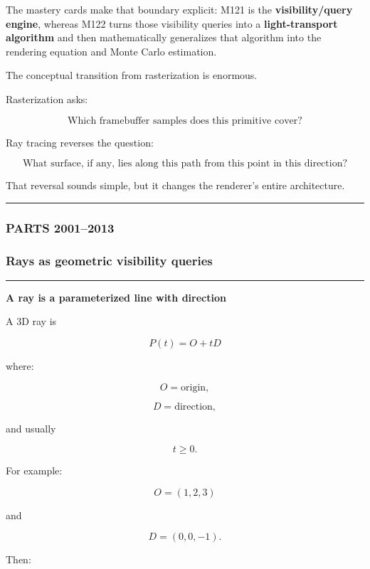The mastery cards make that boundary explicit: M121 is the \textbf{visibility/query engine}, whereas M122 turns those visibility queries into a \textbf{light-transport algorithm} and then mathematically generalizes that algorithm into the rendering equation and Monte Carlo estimation.

The conceptual transition from rasterization is enormous.

Rasterization asks:

\[
\boxed{
\text{Which framebuffer samples does this primitive cover?}
}
\]

Ray tracing reverses the question:

\[
\boxed{
\text{What surface, if any, lies along this path from this point in this direction?}
}
\]

That reversal sounds simple, but it changes the renderer's entire architecture.

\begin{center}\rule{0.5\linewidth}{0.5pt}\end{center}

\subsubsection{PARTS 2001--2013}\label{parts-20012013}

\subsubsection{Rays as geometric visibility queries}\label{rays-as-geometric-visibility-queries}

\begin{center}\rule{0.5\linewidth}{0.5pt}\end{center}

\textbf{A ray is a parameterized line with direction}

A 3D ray is

\[
\boxed{
P(t)=O+tD
}
\]

where:

\[
O=\text{origin},
\]

\[
D=\text{direction},
\]

and usually

\[
t\ge0.
\]

For example:

\[
O=(1,2,3)
\]

and

\[
D=(0,0,-1).
\]

Then:

